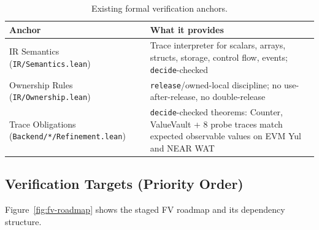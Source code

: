 \documentclass[sigconf]{acmart}
\newcommand{\ttab}{\scriptsize}
\begin{document}
\begin{table}[t]
  \caption{Existing formal verification anchors.}
  \label{tab:fv}
  \centering
  \ttab
  \begin{tabularx}{\textwidth}{l X}
    \toprule
    \bfseries Anchor & \bfseries What it provides \\
    \midrule
    IR Semantics \scriptsize(\texttt{IR/Semantics.lean}) & Trace interpreter for scalars, arrays, structs, storage, control flow, events; \texttt{decide}-checked \\
    \addlinespace
    Ownership Rules \scriptsize(\texttt{IR/Ownership.lean}) & \texttt{release}/owned-local discipline; no use-after-release, no double-release \\
    \addlinespace
    Trace Obligations \scriptsize(\texttt{Backend/*/Refinement.lean}) & \texttt{decide}-checked theorems: Counter, ValueVault + 8 probe traces match expected observable values on EVM Yul and NEAR WAT \\
    \bottomrule
  \end{tabularx}
\end{table}

\subsection{Verification Targets (Priority Order)}

Figure~\ref{fig:fv-roadmap} shows the staged FV roadmap and its dependency structure.
\end{document}
